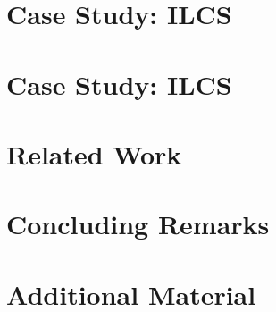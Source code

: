 \documentclass[conference]{IEEEtran}
\begin{document}
%

\section{Case Study: ILCS}


\clearpage

\section{Case Study: ILCS}
\label{sec:experimental}




\section{Related Work}
\label{sec:related}


\clearpage
    
\section{Concluding Remarks}
\label{sec:discussion}


\clearpage





\clearpage

\appendix
\section{Additional Material}
%
\end{document}
